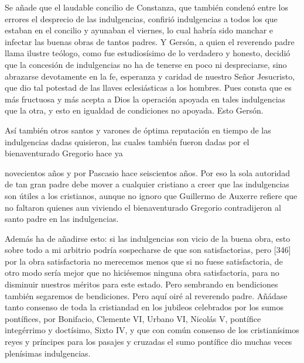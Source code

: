 Se añade que el laudable concilio de Constanza, que también condenó entre los errores el desprecio de las indulgencias, confirió indulgencias a todos los que estaban en el concilio y ayunaban el viernes, lo cual habría sido manchar e infectar las buenas obras de tantos padres. Y Gersón, a quien el reverendo padre llama ilustre teólogo, como fue estudiosísimo de lo verdadero y honesto, decidió que la concesión de indulgencias no ha de tenerse en poco ni despreciarse, sino abrazarse devotamente en la fe, esperanza y caridad de nuestro Señor Jesucristo, que dio tal potestad de las llaves eclesiásticas a los hombres. Pues consta que es más fructuosa y más acepta a Dios la operación apoyada en tales indulgencias que la otra, y esto en igualdad de condiciones no apoyada. Esto Gersón.

Así también otros santos y varones de óptima reputación en tiempo de las indulgencias dadas quisieron, las cuales también fueron dadas por el bienaventurado Gregorio hace ya

novecientos años y por Pascasio hace seiscientos años. Por eso la sola autoridad de tan gran padre debe mover a cualquier cristiano a creer que las indulgencias son útiles a los cristianos, aunque no ignoro que Guillermo de Auxerre refiere que no faltaron quienes aun viviendo el bienaventurado Gregorio contradijeron al santo padre en las indulgencias.

Además ha de añadirse esto: si las indulgencias son vicio de la buena obra, esto sobre todo a mi arbitrio podría sospecharse de que son satisfactorias, pero [346] por la obra satisfactoria no merecemos menos que si no fuese satisfactoria, de otro modo sería mejor que no hiciésemos ninguna obra satisfactoria, para no disminuir nuestros méritos para este estado. Pero sembrando en bendiciones también segaremos de bendiciones. Pero aquí oiré al reverendo padre. Añádase tanto consenso de toda la cristiandad en los jubileos celebrados por los sumos pontífices, por Bonifacio, Clemente VI, Urbano VI, Nicolás V, pontífice integérrimo y doctísimo, Sixto IV, y que con común consenso de los cristianísimos reyes y príncipes para los pasajes y cruzadas el sumo pontífice dio muchas veces plenísimas indulgencias.

